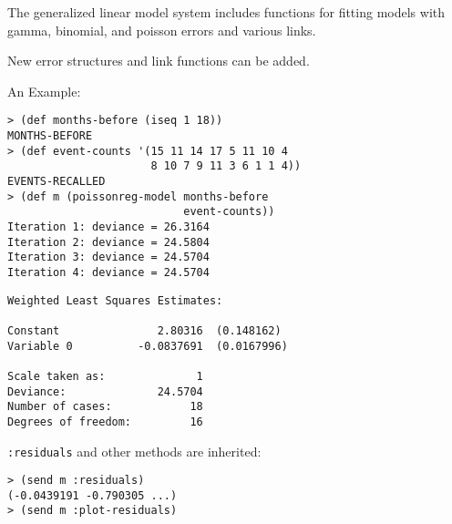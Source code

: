 \begin{slide}{}
The generalized linear model system includes functions for fitting
models with gamma, binomial, and poisson errors and various links.

New error structures and link functions can be added.

An Example:
{\Large
\begin{verbatim}
> (def months-before (iseq 1 18))
MONTHS-BEFORE
> (def event-counts '(15 11 14 17 5 11 10 4
                      8 10 7 9 11 3 6 1 1 4))
EVENTS-RECALLED
> (def m (poissonreg-model months-before
                           event-counts))
Iteration 1: deviance = 26.3164
Iteration 2: deviance = 24.5804
Iteration 3: deviance = 24.5704
Iteration 4: deviance = 24.5704
\end{verbatim}}
\end{slide}

\begin{slide}{}
{\Large
\begin{verbatim}
Weighted Least Squares Estimates:

Constant               2.80316  (0.148162)
Variable 0          -0.0837691  (0.0167996)

Scale taken as:              1
Deviance:              24.5704
Number of cases:            18
Degrees of freedom:         16
\end{verbatim}
{\tt :residuals} and other methods are inherited:
\begin{verbatim}
> (send m :residuals)
(-0.0439191 -0.790305 ...)
> (send m :plot-residuals)
\end{verbatim}}
\end{slide}
